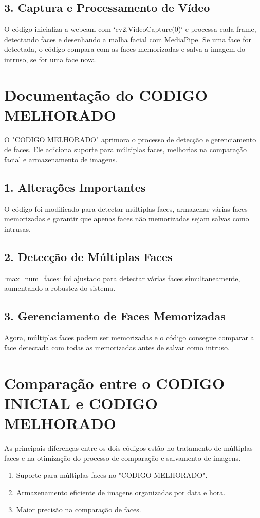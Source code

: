 \documentclass{article}%
\begin{document}
%
\subsection{3. Captura e Processamento de Vídeo}%
\label{subsec:3.CapturaeProcessamentodeVdeo}%
O código inicializa a webcam com `cv2.VideoCapture(0)` e processa cada frame, detectando faces e desenhando a malha facial com MediaPipe. Se uma face for detectada, o código compara com as faces memorizadas e salva a imagem do intruso, se for uma face nova.

%
\section{Documentação do CODIGO MELHORADO}%
\label{sec:DocumentaodoCODIGOMELHORADO}%
O "CODIGO MELHORADO" aprimora o processo de detecção e gerenciamento de faces. Ele adiciona suporte para múltiplas faces, melhorias na comparação facial e armazenamento de imagens.%
\subsection{1. Alterações Importantes}%
\label{subsec:1.AlteraesImportantes}%
O código foi modificado para detectar múltiplas faces, armazenar várias faces memorizadas e garantir que apenas faces não memorizadas sejam salvas como intrusas.

%
\subsection{2. Detecção de Múltiplas Faces}%
\label{subsec:2.DetecodeMltiplasFaces}%
`max\_num\_faces` foi ajustado para detectar várias faces simultaneamente, aumentando a robustez do sistema.

%
\subsection{3. Gerenciamento de Faces Memorizadas}%
\label{subsec:3.GerenciamentodeFacesMemorizadas}%
Agora, múltiplas faces podem ser memorizadas e o código consegue comparar a face detectada com todas as memorizadas antes de salvar como intruso.

%
\section{Comparação entre o CODIGO INICIAL e CODIGO MELHORADO}%
\label{sec:ComparaoentreoCODIGOINICIALeCODIGOMELHORADO}%
As principais diferenças entre os dois códigos estão no tratamento de múltiplas faces e na otimização do processo de comparação e salvamento de imagens.%
\begin{enumerate}%
\item%
Suporte para múltiplas faces no "CODIGO MELHORADO".%
\item%
Armazenamento eficiente de imagens organizadas por data e hora.%
\item%
Maior precisão na comparação de faces.%
\end{enumerate}

%
\end{document}
